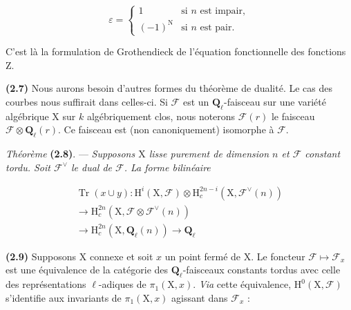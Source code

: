 \documentclass[10pt,leqno]{article}
\begin{document}
\[\varepsilon=\begin{cases}1&\text{si }n\text{ est impair},\\(-1)^{\mathrm N}&\text{si }n\text{ est pair}.\end{cases}\]

\noindent C’est là la formulation de Grothendieck de l’équation fonctionnelle des fonctions \(\mathrm{Z}\).\par

\noindent \textbf{(2.7)} Nous aurons besoin d’autres formes du théorème de dualité. Le cas des courbes nous suffirait dans celles-ci. Si \(\mathcal{F} \) est un \(\mathbf{Q}_{\ell }\)-faisceau sur une variété algébrique \(\mathrm{X}\) sur \(k\) algébriquement clos, nous noterons \(\mathcal{F} (r)\) le faisceau \(\mathcal{F} \otimes \mathbf{Q}_{\ell }(r)\). Ce faisceau est (non canoniquement) isomorphe à \(\mathcal{F} \).\par

\noindent \emph{Théorème} \textbf{(2.8)}. — {\itshape Supposons \(\mathrm{X}\) lisse purement de dimension \(n\) et \(\mathcal{F} \) constant tordu. Soit \(\mathcal{F} ^{\vee }\) le dual de \(\mathcal{F} \). La forme bilinéaire}\par

\begin{equation*}\begin{gathered}\operatorname{Tr}(x\cup y) : \mathrm{H}^{i}(\mathrm{X},\mathcal{F} )\otimes \mathrm{H}_{c}^{2n- i}(\mathrm{X},\mathcal{F} ^{\vee }(n)) \\ \longrightarrow  \mathrm{H}_{c}^{2n}(\mathrm{X},\mathcal{F} \otimes \mathcal{F} ^{\vee }(n)) \\ \longrightarrow  \mathrm{H}_{c}^{2n}(\mathrm{X},\mathbf{Q}_{\ell }(n)) \longrightarrow  \mathbf{Q}_{\ell }\end{gathered}\end{equation*}

\par

\noindent \textbf{(2.9)} Supposons \(\mathrm{X}\) connexe et soit \(x\) un point fermé de \(\mathrm{X}\). Le foncteur \(\mathcal{F} \longmapsto \mathcal{F} _{x}\) est une équivalence de la catégorie des \(\mathbf{Q}_{\ell }\)-faisceaux constants tordus avec celle des représentations \(\ell \)-adiques de \(\pi _{1}(\mathrm{X},x)\). \emph{Via} cette équivalence, \(\mathrm{H}^{0}(\mathrm{X},\mathcal{F} )\) s’identifie aux invariants de \(\pi _{1}(\mathrm{X},x)\) agissant dans \(\mathcal{F} _{x}\) :\par
\end{document}
